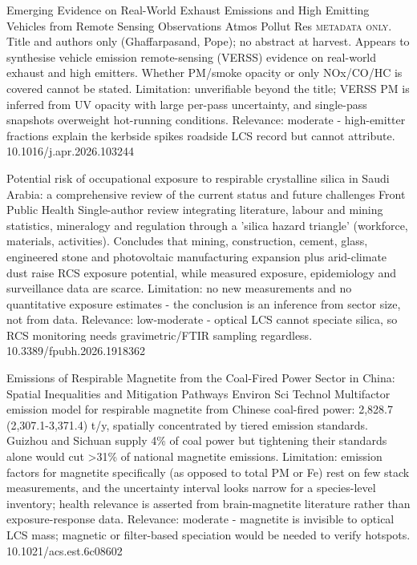 \documentclass[10pt]{article}
\begin{document}
{Emerging Evidence on Real-World Exhaust Emissions and High Emitting Vehicles from Remote Sensing Observations}
{Atmos Pollut Res}
{\textsc{metadata only.} Title and authors only (Ghaffarpasand, Pope); no abstract at harvest. Appears to synthesise vehicle emission remote-sensing (VERSS) evidence on real-world exhaust and high emitters. Whether PM/smoke opacity or only NOx/CO/HC is covered cannot be stated. Limitation: unverifiable beyond the title; VERSS PM is inferred from UV opacity with large per-pass uncertainty, and single-pass snapshots overweight hot-running conditions. Relevance: moderate - high-emitter fractions explain the kerbside spikes roadside LCS record but cannot attribute.}
{10.1016/j.apr.2026.103244}

\par{}\baselineskip{}\baselineskip
{}

{Potential risk of occupational exposure to respirable crystalline silica in Saudi Arabia: a comprehensive review of the current status and future challenges}
{Front Public Health}
{Single-author review integrating literature, labour and mining statistics, mineralogy and regulation through a 'silica hazard triangle' (workforce, materials, activities). Concludes that mining, construction, cement, glass, engineered stone and photovoltaic manufacturing expansion plus arid-climate dust raise RCS exposure potential, while measured exposure, epidemiology and surveillance data are scarce. Limitation: no new measurements and no quantitative exposure estimates - the conclusion is an inference from sector size, not from data. Relevance: low-moderate - optical LCS cannot speciate silica, so RCS monitoring needs gravimetric/FTIR sampling regardless.}
{10.3389/fpubh.2026.1918362}

\par{}\baselineskip{}\baselineskip
{}

{Emissions of Respirable Magnetite from the Coal-Fired Power Sector in China: Spatial Inequalities and Mitigation Pathways}
{Environ Sci Technol}
{Multifactor emission model for respirable magnetite from Chinese coal-fired power: 2,828.7 (2,307.1-3,371.4) t/y, spatially concentrated by tiered emission standards. Guizhou and Sichuan supply 4\% of coal power but tightening their standards alone would cut >31\% of national magnetite emissions. Limitation: emission factors for magnetite specifically (as opposed to total PM or Fe) rest on few stack measurements, and the uncertainty interval looks narrow for a species-level inventory; health relevance is asserted from brain-magnetite literature rather than exposure-response data. Relevance: moderate - magnetite is invisible to optical LCS mass; magnetic or filter-based speciation would be needed to verify hotspots.}
{10.1021/acs.est.6c08602}
\end{document}
